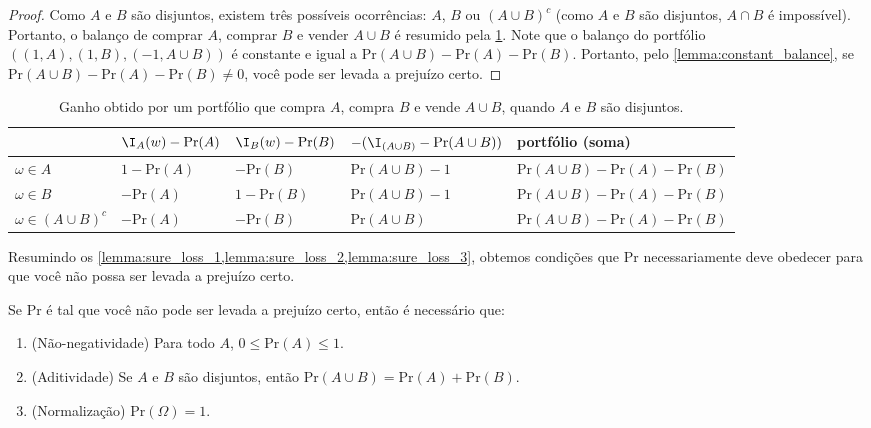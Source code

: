 \begin{proof}
 Como $A$ e $B$ são disjuntos, 
 existem três possíveis ocorrências:
 $A$, $B$ ou $(A \cup B)^{c}$ 
 (como $A$ e $B$ são disjuntos, $A \cap B$ é impossível).
 Portanto, o balanço de comprar $A$, 
 comprar $B$ e vender $A \cup B$ é 
 resumido pela \cref{table:aposta_uniao}.
 Note que o balanço do portfólio
 $((1,A),(1,B),(-1,A \cup B))$ é 
 constante e igual a 
 $\text{Pr}(A \cup B)-\text{Pr}(A)-\text{Pr}(B)$.
 Portanto, pelo \cref{lemma:constant_balance}, se
 $\text{Pr}(A \cup B)-\text{Pr}(A)-\text{Pr}(B) \neq 0$,
 você pode ser levada a prejuízo certo.
\end{proof}

\begin{table}
 \centering
 \begin{tabular}{|l|l|l|l|l|}
  \hline
  & $\I_{A}(w)-\text{Pr}(A)$
  & $\I_{B}(w)-\text{Pr}(B)$
  & $-(\I_{(A \cup B)}-\text{Pr}(A \cup B))$
  & portfólio (soma) \\
  \hline
  $\omega \in A$
  & $1-\text{Pr}(A)$
  & $-\text{Pr}(B)$
  & $\text{Pr}(A \cup B)-1$
  &	$\text{Pr}(A \cup B)-\text{Pr}(A)-\text{Pr}(B)$ \\
  $\omega \in B$ 
  & $-\text{Pr}(A)$
  & $1-\text{Pr}(B)$
  &	$\text{Pr}(A \cup B)-1$
  &	$\text{Pr}(A \cup B)-\text{Pr}(A)-\text{Pr}(B)$ \\
  $\omega \in (A \cup B)^{c}$
  & $-\text{Pr}(A)$
  & $-\text{Pr}(B)$
  & $\text{Pr}(A \cup B)$
  & $\text{Pr}(A \cup B)-\text{Pr}(A)-\text{Pr}(B)$ \\
  \hline
 \end{tabular}
 \caption{Ganho obtido por um portfólio que 
 compra $A$, compra $B$ e vende $A \cup B$, 
 quando $A$ e $B$ são disjuntos.}
 \label{table:aposta_uniao}
\end{table}

Resumindo os \cref{lemma:sure_loss_1,lemma:sure_loss_2,lemma:sure_loss_3},
obtemos condições que $\text{Pr}$ necessariamente deve obedecer para que você não possa ser levada
a prejuízo certo.

\begin{lemma}
 \label{lemma:sure_loss_additivity}
 Se $\text{Pr}$ é tal que 
 você não pode ser levada a prejuízo certo, então 
 é necessário que:
 \begin{enumerate}
  \item (Não-negatividade) Para todo $A$, 
  $0 \leq \text{Pr}(A) \leq 1$.
  \item (Aditividade) Se $A$ e $B$ são disjuntos, então
  $\text{Pr}(A \cup B) = \text{Pr}(A)+\text{Pr}(B)$.
  \item (Normalização) $\text{Pr}(\Omega) = 1$.
 \end{enumerate}
\end{lemma}

